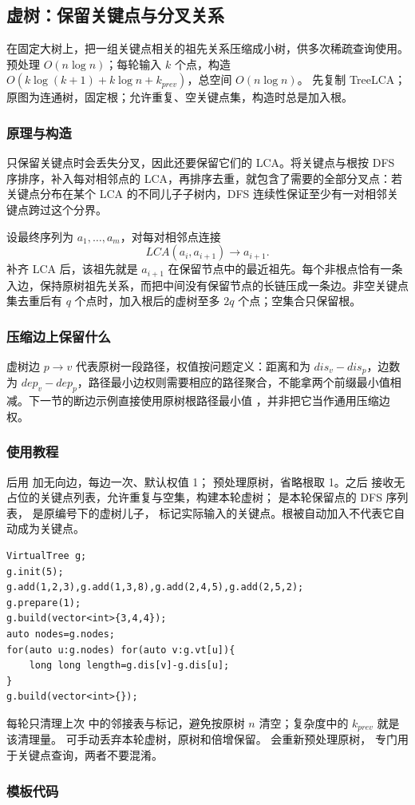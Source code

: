 \subsection{虚树：保留关键点与分叉关系}
\label{tree:virtual-tree}
\AlgorithmInfo
    {在固定大树上，把一组关键点相关的祖先关系压缩成小树，供多次稀疏查询使用。}
    {预处理 $O(n\log n)$；每轮输入 $k$ 个点，构造 $O(k\log(k+1)+k\log n+k_{prev})$，总空间 $O(n\log n)$。}
    {先复制 TreeLCA；原图为连通树，固定根；允许重复、空关键点集，构造时总是加入根。}
\subsubsection*{原理与构造}
只保留关键点时会丢失分叉，因此还要保留它们的 LCA。将关键点与根按 DFS 序排序，补入每对相邻点的 LCA，再排序去重，就包含了需要的全部分叉点：若关键点分布在某个 LCA 的不同儿子子树内，DFS 连续性保证至少有一对相邻关键点跨过这个分界。

设最终序列为 $a_1,\ldots,a_m$，对每对相邻点连接
\[
    LCA(a_i,a_{i+1})\longrightarrow a_{i+1}.
\]
补齐 LCA 后，该祖先就是 $a_{i+1}$ 在保留节点中的最近祖先。每个非根点恰有一条入边，保持原树祖先关系，而把中间没有保留节点的长链压成一条边。非空关键点集去重后有 $q$ 个点时，加入根后的虚树至多 $2q$ 个点；空集合只保留根。

\subsubsection*{压缩边上保留什么}
虚树边 $p\to v$ 代表原树一段路径，权值按问题定义：距离和为 $dis_v-dis_p$，边数为 $dep_v-dep_p$，路径最小边权则需要相应的路径聚合，不能拿两个前缀最小值相减。下一节的断边示例直接使用原树根路径最小值 ，并非把它当作通用压缩边权。

\subsubsection*{使用教程}
 后用  加无向边，每边一次、默认权值 1； 预处理原树，省略根取 1。之后  接收无占位的关键点列表，允许重复与空集，构建本轮虚树； 是本轮保留点的 DFS 序列表， 是原编号下的虚树儿子， 标记实际输入的关键点。根被自动加入不代表它自动成为关键点。
\begin{lstlisting}[style=mtycpp,numbers=none]
VirtualTree g;
g.init(5);
g.add(1,2,3),g.add(1,3,8),g.add(2,4,5),g.add(2,5,2);
g.prepare(1);
g.build(vector<int>{3,4,4});
auto nodes=g.nodes;
for(auto u:g.nodes) for(auto v:g.vt[u]){
	long long length=g.dis[v]-g.dis[u];
}
g.build(vector<int>{});
\end{lstlisting}
每轮只清理上次  中的邻接表与标记，避免按原树 $n$ 清空；复杂度中的 $k_{prev}$ 就是该清理量。 可手动丢弃本轮虚树，原树和倍增保留。 会重新预处理原树， 专门用于关键点查询，两者不要混淆。
\subsubsection*{模板代码}
